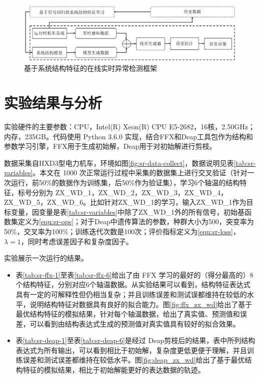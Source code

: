 \begin{figure}[H]
\centering
\includegraphics[scale=0.5]{figures/sr-anomaly-framework-application.png}
\caption{基于系统结构特征的在线实时异常检测框架}
\label{fig:sr-application}
\end{figure}

\section{实验结果与分析}
\label{sec:sr-experiment}


实验硬件的主要参数：CPU，Intel(R) Xeon(R) CPU E5-2682，16核，2.50GHz；内存，235GB。代码使用 Python 3.6.0 实现，结合FFX和Deap工具包作为结构和参数学习引擎，FFX用于生成初始解，Deap用于对初始解进行剪枝。

数据采集自HXD3型电力机车，环境如图\ref{fig:sr-data-collect}，数据说明见表\ref{tab:sr-variables}。本文在 1000 次正常运行过程中采集的数据集上进行交叉验证（针对一次运行，前50\%的数据作为训练集，后50\%作为验证集），学习6个轴温的结构特征，标号分别为 ZX\_WD\_1，ZX\_WD\_2，ZX\_WD\_3，ZX\_WD\_4，ZX\_WD\_5，ZX\_WD\_6。比如针对ZX\_WD\_1的学习，输入ZX\_WD\_1作为目标变量，因变量是表\ref{tab:sr-variables}中除了ZX\_WD\_1外的所有信号，初始基函数集定义为\ref{equ:sr-ops}；对于Deap中遗传算法的参数，种群大小为500，突变率为50\%，交叉率为100\%；训练迭代次数是100次；评价指标定义为\ref{equ:sr-loss}，$\lambda=1$，同时考虑误差因子和复杂度因子。

实验展示一次运行的结果。
\begin{itemize}
  \item 表\ref{tab:sr-ffx-1}至表\ref{tab:sr-ffx-6}给出了由 FFX 学习的最好的（得分最高的）8个结构特征，分别对应6个轴温数据。从实验结果可以看到，结构特征表达式具有一定的可解释性但仍相当复杂；并且训练误差和测试误都维持在较低的水平，说明结构特征对数据具有良好的拟合能力。图\ref{fig:ffx_zx_wd}给出了基于最优结构特征的模拟结果，针对每个轴温数据，给出了真实值、预测值和误差，可以看到由结构表达式生成的预测值对真实值具有较好的拟合效果。
  \item 表\ref{tab:sr-deap-1}至表\ref{tab:sr-deap-6}是经过 Deap剪枝后的结果，表中所列结构表达式为所有输出，可以看到相比于初始解，复杂度更低更便于理解，并且训练误差和测试误差都维持在较低水平。图\ref{fig:deap_zx_wd}给出了基于最优结构特征的模拟结果，相比于初始解能更好的表达数据的轨迹。
\end{itemize}

